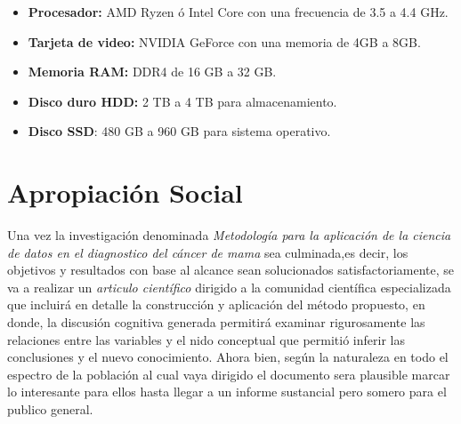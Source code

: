 \begin{itemize}
	\item \textbf{Procesador:} AMD Ryzen ó Intel Core con una frecuencia de 3.5 a 4.4 GHz.
	\item \textbf{Tarjeta de video:} NVIDIA GeForce con una memoria de 4GB a 8GB. 
	\item \textbf{Memoria RAM:} DDR4 de 16 GB a 32 GB.
	\item \textbf{Disco duro HDD:} 2 TB a 4 TB para almacenamiento.
	\item \textbf{Disco SSD}: 480 GB a 960 GB para sistema operativo.
\end{itemize} 

\newpage
\section{Apropiación Social}

Una vez la investigación denominada \textit{Metodología para la aplicación de la ciencia de datos en el diagnostico del cáncer de mama } sea culminada,es decir, los objetivos y resultados con base al alcance sean solucionados satisfactoriamente, se va a realizar un \textit{articulo científico} dirigido a la comunidad científica especializada que incluirá en detalle la construcción y aplicación del método propuesto, en donde, la discusión cognitiva generada permitirá examinar rigurosamente las relaciones entre las variables y el nido conceptual que permitió inferir las conclusiones y el nuevo conocimiento. Ahora bien, según la naturaleza en todo el espectro de la población al cual vaya dirigido el documento sera plausible marcar lo interesante para ellos hasta llegar a un informe sustancial pero somero para el publico general.



